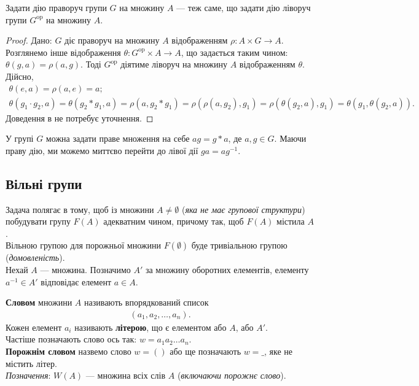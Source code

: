 \documentclass{math_library}
\begin{document}
\begin{proposition}
Задати дію праворуч групи $G$ на множину $A$ --- теж саме, що задати дію ліворуч групи $G^{\text{op}}$ на множину $A$.
\end{proposition}

\begin{proof}
\rightproof Дано: $G$ діє праворуч на множину $A$ відображенням $\rho \colon A \times G \to A$. Розглянемо інше відображення $\theta \colon G^{\text{op}} \times A \to A$, що задається таким чином: $\theta(g,a) = \rho(a,g)$. Тоді $G^{\text{op}}$ діятиме ліворуч на множину $A$ відображенням $\theta$. Дійсно,
\begin{align*}
\theta(e,a) = \rho(a,e) = a; \\
\theta(g_1 \cdot g_2,a) = \theta(g_2*g_1,a) = \rho(a, g_2*g_1) = \rho(\rho(a,g_2), g_1) = \rho(\theta(g_2,a), g_1) = \theta(g_1,\theta(g_2,a)).
\end{align*}
Доведення в \leftproof не потребує уточнення.
\end{proof}

\begin{remark}
У групі $G$ можна задати праве множення на себе $ag = g*a$, де $a,g \in G$. Маючи праву дію, ми можемо миттєво перейти до лівої дії $ga = ag^{-1}$. 
\end{remark}

\subsection{Вільні групи}
Задача полягає в тому, щоб із множини $A \neq \emptyset$ (\textit{яка не має групової структури}) побудувати групу $F(A)$ адекватним чином, причому так, щоб $F(A)$ містила $A$.
\bigskip \\
Вільною групою для порожньої множини $F(\emptyset)$ буде тривіальною групою (\textit{домовленість}).
\bigskip \\
Нехай $A$ --- множина. Позначимо $A'$ за множину оборотних елементів, елементу $a^{-1} \in A'$ відповідає елемент $a \in A$.

\begin{definition}
\textbf{Словом} множини $A$ називають впорядкований список
\begin{align*}
(a_1,a_2,\dots,a_n).
\end{align*}
Кожен елемент $a_i$ називають \textbf{літерою}, що є елементом або $A$, або $A'$.\\  
Частіше позначають слово ось так: $w = a_1a_2 \dots a_n$.
\bigskip \\
\textbf{Порожнім словом} назвемо слово $w = ()$ або ще позначають $w = \_$, яке не містить літер.
\bigskip \\
\textit{Позначення}: $W(A)$ --- множина всіх слів $A$ (\textit{включаючи порожнє слово}).
\end{definition}
\end{document}
